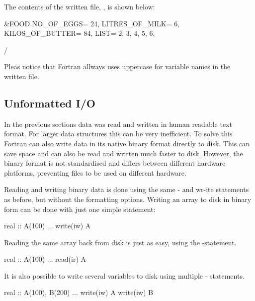 The contents of the written file, , is shown below:

\cmdmode

\begin{fortrancodeenv}
&FOOD
 NO_OF_EGGS=         24,
 LITRES_OF_MILK=          6,
 KILOS_OF_BUTTER=         84,
 LIST=          2,          3,          4,          5,          6,

 /
\end{fortrancodeenv}

Pleas notice that Fortran allways uses uppercase for variable names in the written file.

%

\subsection{Unformatted I/O}

In the previous sections data was read and written in human readable text format. For larger data structures this can be very inefficient. To solve this Fortran can also write data in its native binary format directly to disk. This can save space and can also be read and written much faster to disk. However, the binary format is not standardised and differs between different hardware platforms, preventing files to be used on different hardware.

Reading and writing binary data is done using the same - and wr-ite statements as before, but without the formatting options. Writing an array to disk in binary form can be done with just one simple statement:

\fmode

\begin{fortrancodeenv}
real :: A(100)
...
write(iw) A
\end{fortrancodeenv}

Reading the same array back from disk is just as easy, using the -statement.

\begin{fortrancodeenv}
real :: A(100)
...
read(ir) A
\end{fortrancodeenv}

It is also possible to write several variables to disk using multiple - statements.

\begin{fortrancodeenv}
real :: A(100), B(200)
...
write(iw) A
write(iw) B
\end{fortrancodeenv}

